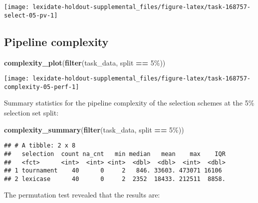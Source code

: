 \documentclass[
]{book}
\newenvironment{Shaded}{\begin{snugshade}}{\end{snugshade}}
\newcommand{\FunctionTok}[1]{\textcolor[rgb]{0.13,0.29,0.53}{\textbf{#1}}}
\newcommand{\NormalTok}[1]{#1}
\newcommand{\SpecialCharTok}[1]{\textcolor[rgb]{0.81,0.36,0.00}{\textbf{#1}}}
\newcommand{\StringTok}[1]{\textcolor[rgb]{0.31,0.60,0.02}{#1}}
\begin{document}
\texttt{[image: lexidate-holdout-supplemental\_files/figure-latex/task-168757-select-05-pv-1]}

\hypertarget{pipeline-complexity-19}{%
\subsection{Pipeline complexity}\label{pipeline-complexity-19}}

\begin{Shaded}
\begin{Highlighting}[]
\FunctionTok{complexity\_plot}\NormalTok{(}\FunctionTok{filter}\NormalTok{(task\_data, split }\SpecialCharTok{==} \StringTok{\textquotesingle{}5\%\textquotesingle{}}\NormalTok{))}
\end{Highlighting}
\end{Shaded}

\texttt{[image: lexidate-holdout-supplemental\_files/figure-latex/task-168757-complexity-05-perf-1]}

Summary statistics for the pipeline complexity of the selection schemes at the 5\% selection set split:

\begin{Shaded}
\begin{Highlighting}[]
\FunctionTok{complexity\_summary}\NormalTok{(}\FunctionTok{filter}\NormalTok{(task\_data, split }\SpecialCharTok{==} \StringTok{\textquotesingle{}5\%\textquotesingle{}}\NormalTok{))}
\end{Highlighting}
\end{Shaded}

\begin{verbatim}
## # A tibble: 2 x 8
##   selection  count na_cnt   min median   mean    max    IQR
##   <fct>      <int>  <int> <int>  <dbl>  <dbl>  <int>  <dbl>
## 1 tournament    40      0     2   846. 33603. 473071 16106 
## 2 lexicase      40      0     2  2352  18433. 212511  8858.
\end{verbatim}

The permutation test revealed that the results are:
\end{document}
